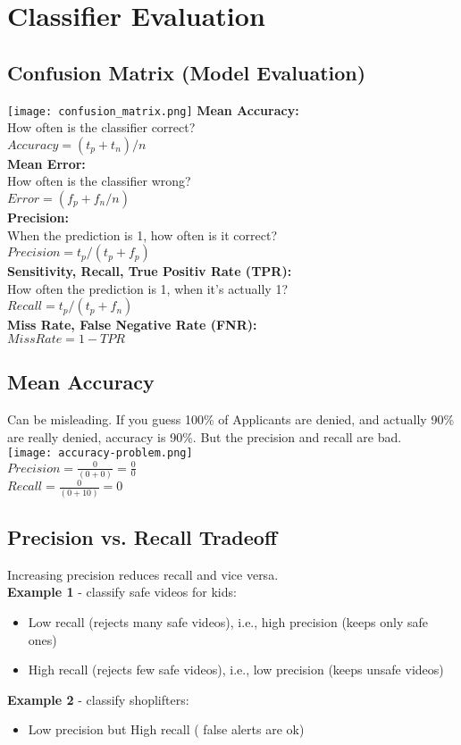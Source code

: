 \section{Classifier Evaluation}
\subsection{Confusion Matrix (Model Evaluation)}
\texttt{[image: confusion\_matrix.png]}
\textbf{Mean Accuracy:}\\
How often is the classifier correct?\\
$Accuracy = (t_p + t_n) / n$\\
\textbf{Mean Error:}\\
How often is the classifier wrong?\\
$Error = (f_p + f_n / n)$\\
\textbf{Precision:}\\
When the prediction is 1, how often is it correct?\\
$Precision = t_p / (t_p + f_p)$\\
\textbf{Sensitivity, Recall, True Positiv Rate (TPR):}\\
How often the prediction is 1, when it's actually 1?\\
$Recall = t_p / (t_p + f_n)$\\
\textbf{Miss Rate, False Negative Rate (FNR):}\\
$Miss Rate = 1 - TPR$

\subsection{Mean Accuracy}
Can be misleading. If you guess 100\% of Applicants are denied, and actually 90\% are really denied, accuracy is 90\%.
But the precision and recall are bad.\\
\texttt{[image: accuracy-problem.png]}\\
$Precision = \frac{0}{(0 + 0)} = \frac{0}{0}$\\
$Recall = \frac{0}{(0 + 10)} = 0$

\subsection{Precision vs. Recall Tradeoff}
Increasing precision reduces recall and vice versa.\\
\textbf{Example 1} - classify safe videos for kids:
\begin{itemize}
  \item Low recall (rejects many safe videos), i.e., high precision (keeps only safe ones)
  \item High recall (rejects few safe videos), i.e., low precision (keeps unsafe videos)
\end{itemize}
\textbf{Example 2} - classify shoplifters:
\begin{itemize}
  \item Low precision but High recall ( false alerts are ok)
\end{itemize}


